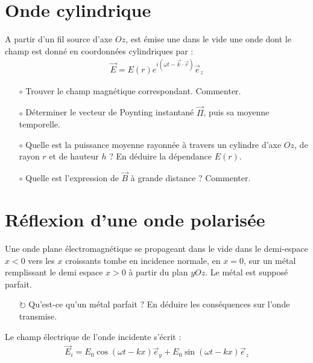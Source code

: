 \documentclass{report}
\begin{document}
\section*{Onde cylindrique}

A partir d'un fil source d'axe $Oz$, est émise une dans le vide une onde dont le champ est donné en coordonnées cylindriques par :
\begin{align*}
	\vec{E}=E(r)e^{i(\omega t-\vec{k}\cdot\vec{r})}\vec{e}_z
\end{align*}

\begin{itemize}

	\item[$\circ$] Trouver le champ magnétique correspondant. Commenter.
	
	\item[$\circ$] Déterminer le vecteur de Poynting instantané $\vec{\Pi}$, puis sa moyenne temporelle.
	
	\item[$\circ$] Quelle est la puissance moyenne rayonnée à travers un cylindre d'axe $Oz$, de rayon $r$ et de hauteur $h$ ? En déduire la dépendance $E(r)$. 
	
	\item[$\circ$] Quelle est l'expression de $\vec{B}$ à grande distance ? Commenter.
	
\end{itemize}

\newpage

\section*{Réflexion d'une onde polarisée}

Une onde plane électromagnétique se propageant dans le vide dans le demi-espace $x<0$ vers les $x$ croissants tombe en incidence normale, en $x=0$, sur un métal remplissant le demi espace $x>0$ à partir du plan $yOz$. Le métal est supposé parfait.

\begin{itemize}

	\item[$\circlearrowright$] Qu'est-ce qu'un métal parfait ? En déduire les conséquences sur l'onde transmise. 

\end{itemize}

Le champ électrique de l'onde incidente s'écrit :
\begin{align*}
	\vec{E}_i=E_0\cos(\omega t -kx)\vec{e}_y+E_0\sin(\omega t -kx)\vec{e}_z
\end{align*}
\end{document}
